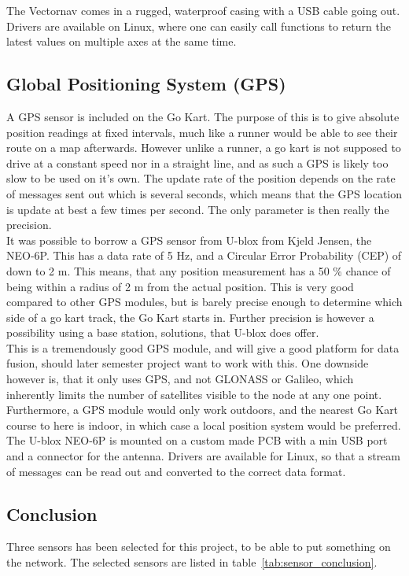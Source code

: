 The Vectornav comes in a rugged, waterproof casing with a USB cable going out.
Drivers are available on Linux, where one can easily call functions to return the latest values on multiple axes at the same time.

\subsection{Global Positioning System (GPS)}
A GPS sensor is included on the Go Kart. 
The purpose of this is to give absolute position readings at fixed intervals, much like a runner would be able to see their route on a map afterwards.
However unlike a runner, a go kart is not supposed to drive at a constant speed nor in a straight line, and as such a GPS is likely too slow to be used on it's own.
The update rate of the position depends on the rate of messages sent out which is several seconds, which means that the GPS location is update at best a few times per second. 
The only parameter is then really the precision. \\

It was possible to borrow a GPS sensor from U-blox from Kjeld Jensen, the NEO-6P.
This has a data rate of 5 Hz, and a Circular Error Probability (CEP) of down to 2 m.
This means, that any position measurement has a 50 \% chance of being within a radius of 2 m from the actual position. 
This is very good compared to other GPS modules, but is barely precise enough to determine which side of a go kart track, the Go Kart starts in. 
Further precision is however a possibility using a base station, solutions, that U-blox does offer.\\

This is a tremendously good GPS module, and will give a good platform for data fusion, should later semester project want to work with this. 
One downside however is, that it only uses GPS, and not GLONASS or Galileo, which inherently limits the number of satellites visible to the node at any one point. 
Furthermore, a GPS module would only work outdoors, and the nearest Go Kart course to here is indoor, in which case a local position system would be preferred.\\

The U-blox NEO-6P is mounted on a custom made PCB with a min USB port and a connector for the antenna. 
Drivers are available for Linux, so that a stream of messages can be read out and converted to the correct data format.

\subsection{Conclusion}
Three sensors has been selected for this project, to be able to put something on the network.
The selected sensors are listed in table~\ref{tab:sensor_conclusion}.

